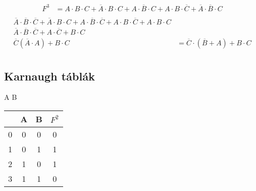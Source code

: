 \documentclass{article}
\begin{document}
\begin{align*}
    F^3 & = A \cdot B \cdot C + \overline{A} \cdot B \cdot C + A \cdot \overline{B} \cdot C + A \cdot B \cdot \overline{C} + \overline{A} \cdot \overline{B} \cdot C \\
\end{align*}
\begin{align*}
    \overline{A} \cdot \overline{B} \cdot \overline{C} + \overline{A} \cdot B \cdot C + A \cdot \overline{B} \cdot \overline{C} + A \cdot B \cdot \overline{C} + A \cdot B \cdot C \\
    \overline{A} \cdot \overline{B} \cdot \overline{C} + A \cdot \overline{C} + B \cdot C                                                                                          \\
    \overline{C} (\overline{A} \cdot A) + B \cdot C & =
    \overline{C} \cdot (\overline{B} + A) + B \cdot C                                                                                                                              \\
\end{align*}

\subsection{Karnaugh táblák}
A B
\begin{table}[ht]
    \begin{tabular}{c|c|c||c}
          & \textbf{A} & \textbf{B} & \textbf{\(F^2\)} \\
        \hline
        0 & 0          & 0          & 0                \\
        \hline
        1 & 0          & 1          & 1                \\
        \hline
        2 & 1          & 0          & 1                \\
        \hline
        3 & 1          & 1          & 0                \\
    \end{tabular}
\end{table}
\end{document}
